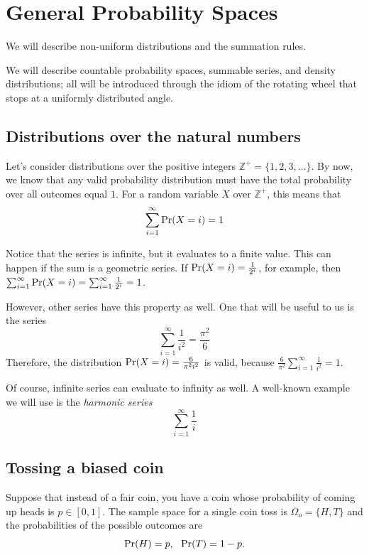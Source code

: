 \chapter{General Probability Spaces}

We will describe non-uniform distributions and the summation rules.

We will describe countable probability spaces, summable series, and
density distributions; all will be introduced through the idiom of the
rotating wheel that stops at a uniformly distributed angle.

\section{Distributions over the natural numbers}

Let's consider distributions over the positive integers $\mathbb{Z}^+ = \{1, 2, 3, \dots\}$. 
By now, we know that any valid probability distribution must have the total probability over all outcomes equal $1$. 
For a random variable $X$ over $\mathbb{Z}^+$, this means that
$$ \sum_{i=1}^\infty \mbox{\rm Pr}(X = i) = 1 $$

Notice that the series is infinite, but it evaluates to a finite value. 
This can happen if the sum is a geometric series. 
If $\mbox{\rm Pr}(X = i) = \frac{1}{2^i} $, for example, then $ \sum_{i=1}^\infty \mbox{\rm Pr}(X = i) = \sum_{i=1}^\infty \frac{1}{2^i} = 1 $. 

However, other series have this property as well. 
One that will be useful to us is the series
$$ \sum_{i=1}^\infty \frac{1}{i^2} = \frac{\pi^2}{6} $$
Therefore, the distribution $\mbox{\rm Pr}(X = i) = \frac{6}{\pi^2 i^2}$ is valid, because $ \frac{6}{\pi^2} \sum_{i=1}^\infty \frac{1}{i^2} = 1 $.

Of course, infinite series can evaluate to infinity as well. 
A well-known example we will use is the \emph{harmonic series}
$$ \sum_{i=1}^\infty \frac{1}{i} $$




\section{Tossing a biased coin}
\label{sec:BaisedCoin}

Suppose that instead of a fair coin, you have a coin whose probability of coming up heads is $p \in [0,1]$. The sample space for a single coin toss is $\Omega_o = \{H,T\}$ and the probabilities of the possible outcomes are
$$ \mbox{\rm Pr}(H) = p, \ \ \mbox{\rm Pr}(T) = 1-p.$$

